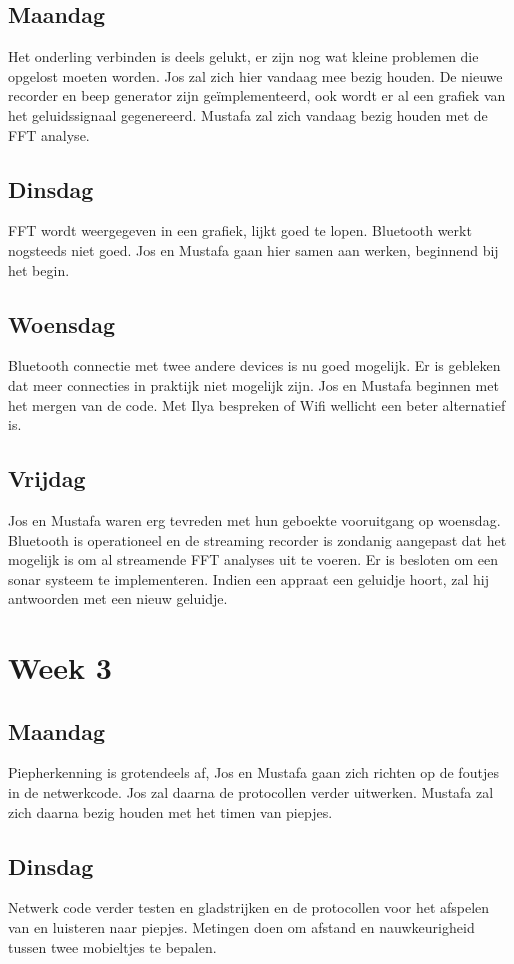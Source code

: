 \documentclass[12pt]{article}
\begin{document}
\subsection*{Maandag}
Het onderling verbinden is deels gelukt, er zijn nog wat kleine problemen die opgelost moeten worden. Jos zal zich hier vandaag mee bezig houden. De nieuwe recorder en beep generator zijn ge\"implementeerd, ook wordt er al een grafiek van het geluidssignaal gegenereerd. Mustafa zal zich vandaag bezig houden met de FFT analyse.
\subsection*{Dinsdag}
FFT wordt weergegeven in een grafiek, lijkt goed te lopen. Bluetooth werkt nogsteeds niet goed. Jos en Mustafa gaan hier samen aan werken, beginnend bij het begin.
\subsection*{Woensdag}
Bluetooth connectie met twee andere devices is nu goed mogelijk. Er is gebleken dat meer connecties in praktijk niet mogelijk zijn. Jos en Mustafa beginnen met het mergen van de code. Met Ilya bespreken of Wifi wellicht een beter alternatief is.
\subsection*{Vrijdag}
Jos en Mustafa waren erg tevreden met hun geboekte vooruitgang op woensdag. Bluetooth is operationeel en de streaming recorder is zondanig aangepast dat het mogelijk is om al streamende FFT analyses uit te voeren. Er is besloten om een sonar systeem te implementeren. Indien een appraat een geluidje hoort, zal hij antwoorden met een nieuw geluidje. 

\section*{Week 3}
\subsection*{Maandag}
Piepherkenning is grotendeels af, Jos en Mustafa gaan zich richten op de foutjes in de netwerkcode. Jos zal daarna de protocollen verder uitwerken. Mustafa zal zich daarna bezig houden met het timen van piepjes.
\subsection*{Dinsdag}
Netwerk code verder testen en gladstrijken en de protocollen voor het afspelen van en luisteren naar piepjes. Metingen doen om afstand en nauwkeurigheid tussen twee mobieltjes te bepalen.
\end{document}
